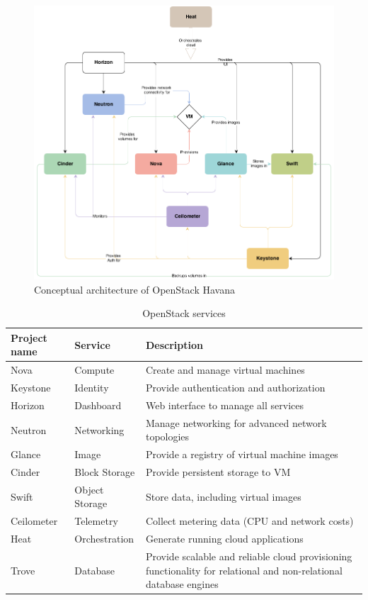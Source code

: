 \begin{figure}[h]
	\centering
	\includegraphics[scale=0.5]{figures/openstack_havana_conceptual_arch.png}
	\caption{Conceptual architecture of OpenStack Havana \cite{osarch}}
	\label{fig:openstack_services_arch}
\end{figure}

\begin{table}[h]
	\centering
	\begin{tabular}{|l|l|p{9.5cm}|}
		\hline
		\textbf{Project name} & \textbf{Service} & \textbf{Description}\\
		\hline
		Nova & Compute & Create and manage virtual machines\\
		Keystone & Identity & Provide authentication and authorization\\
		Horizon & Dashboard & Web interface to manage all services\\
		Neutron & Networking & Manage networking for advanced network topologies\\
		Glance & Image & Provide a registry of virtual machine images\\
		Cinder & Block Storage & Provide persistent storage to VM\\
		Swift & Object Storage & Store data, including virtual images\\
		Ceilometer & Telemetry & Collect metering data (CPU and network costs)\\
		Heat & Orchestration & Generate running cloud applications\\
		Trove & Database & Provide scalable and reliable cloud provisioning functionality for relational and non-relational database engines\\
		\hline
	\end{tabular}
	\caption{OpenStack services}
	\label{table:openstack_services_list}
\end{table}

